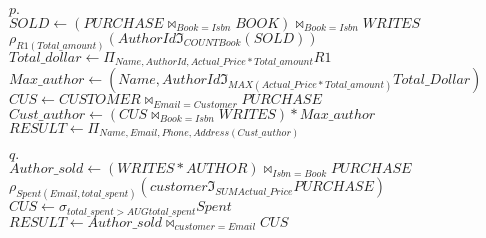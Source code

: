 \documentclass{article}
\begin{document}
$p.$\\
$SOLD \leftarrow (PURCHASE \bowtie_{Book = Isbn} BOOK)\bowtie_{Book = Isbn}WRITES$\\
$\rho_{R1(Total\_amount)}(AuthorId \Im_{COUNT Book}(SOLD))$\\
$Total\_dollar \leftarrow \Pi_{Name,AuthorId,Actual\_Price*Total\_amount}R1$\\
$Max\_author \leftarrow (Name, AuthorId\Im_{MAX(Actual\_Price*Total\_amount)}Total\_Dollar)$\\
$CUS \leftarrow CUSTOMER \bowtie_{Email = Customer}PURCHASE$\\
$Cust\_author \leftarrow (CUS \bowtie_{Book = Isbn}WRITES)*Max\_author$\\
$RESULT \leftarrow \Pi_{Name,Email,Phone,Address(Cust\_author)}$
\hfill \break

$q.$\\
$Author\_sold \leftarrow(WRITES * AUTHOR)\bowtie_{Isbn = Book}PURCHASE$\\
$\rho_{Spent(Email,total\_spent)}(customer \Im_{SUM Actual\_Price}PURCHASE)$\\
$CUS \leftarrow \sigma_{total\_spent > AUG total\_spent}Spent$\\
$RESULT \leftarrow Author\_sold \bowtie_{customer=Email}CUS$\\
\end{document}
